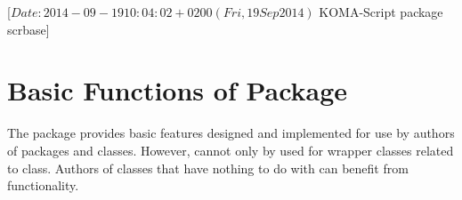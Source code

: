 %
%
%
%
%
%
%
%
% 
%
%
%
%

                 [$Date: 2014-09-19 10:04:02 +0200 (Fri, 19 Sep 2014) $
                  KOMA-Script package scrbase]


\chapter{Basic Functions of Package }

%

The package  provides basic features designed and implemented
for use by authors of packages and classes. However,  cannot
only by used for wrapper classes related to \KOMAScript{} class. Authors of
classes that have nothing to do with \KOMAScript{} can benefit from
 functionality.

